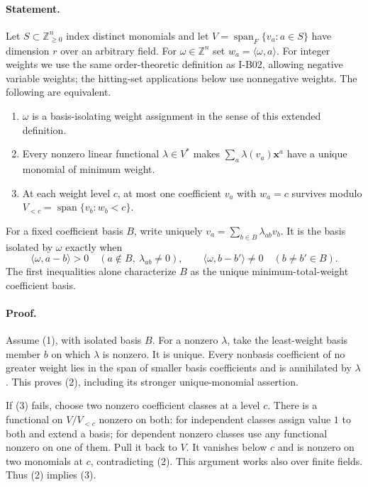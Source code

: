\documentclass[11pt,a4paper]{article}
\theoremstyle{definition}\newtheorem{definition}{Definition}
\begin{document}
\paragraph{Statement.}
Let $S\subset\mathbb Z_{\geq0}^n$ index distinct monomials and let
$V=\operatorname{span}_F\{v_a:a\in S\}$ have dimension $r$ over an arbitrary field.
For $\omega\in\mathbb Z^n$ set $w_a=\langle\omega,a\rangle$.
For integer weights we use the same order-theoretic definition as
I-B02, allowing negative variable weights; the hitting-set
applications below use nonnegative weights.
The following are equivalent.
\begin{enumerate}
\item $\omega$ is a basis-isolating weight assignment in the sense of
this extended definition.
\item Every nonzero linear functional $\lambda\in V^*$ makes
$\sum_a\lambda(v_a)\mathbf x^a$ have a unique monomial of minimum weight.
\item At each weight level $c$, at most one coefficient $v_a$ with
$w_a=c$ survives modulo
$V_{<c}=\operatorname{span}\{v_b:w_b<c\}$.
\end{enumerate}
For a fixed coefficient basis $B$, write uniquely
$v_a=\sum_{b\in B}\lambda_{ab}v_b$.  It is the basis isolated by
$\omega$ exactly when
\[
 \langle\omega,a-b\rangle>0
 \quad(a\notin B,\ \lambda_{ab}\ne0),
 \qquad
 \langle\omega,b-b'\rangle\ne0\quad(b\ne b'\in B).
\tag{I.3}\label{eq:I-cone}
\]
The first inequalities alone characterize $B$ as the unique
minimum-total-weight coefficient basis.

\paragraph{Proof.}
Assume (1), with isolated basis $B$.  For a nonzero $\lambda$, take
the least-weight basis member $b$ on which $\lambda$ is nonzero.
It is unique.  Every nonbasis coefficient of no greater weight lies
in the span of smaller basis coefficients and is annihilated by
$\lambda$.  This proves (2), including its stronger unique-monomial
assertion.

If (3) fails, choose two nonzero coefficient classes at a level $c$.
There is a functional on $V/V_{<c}$ nonzero on both: for independent
classes assign value $1$ to both and extend a basis; for dependent
nonzero classes use any functional nonzero on one of them.  Pull it
back to $V$.  It vanishes below $c$ and is nonzero on two monomials
at $c$, contradicting (2).  This argument works also over finite
fields.  Thus (2) implies (3).
\end{document}
